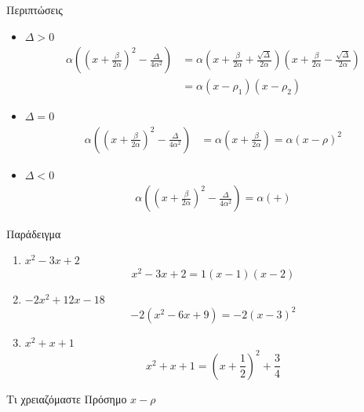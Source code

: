 \documentclass{../../presentation}
\begin{document}
\begin{frame}{Περιπτώσεις}
  \begin{itemize}[<+->]
    \item $Δ>0$
          \begin{align*}
            α\left(\left( x+\frac{β}{2α} \right)^2 - \frac{Δ}{4α^2}\right) & =
            α\left( x+\frac{β}{2α} + \frac{\sqrt{Δ}}{2α} \right)\left( x+\frac{β}{2α} - \frac{\sqrt{Δ}}{2α} \right) \\
                                                                           & = α(x-ρ_1)(x-ρ_2)
          \end{align*}
    \item $Δ=0$
          \begin{align*}
            α\left(\left( x+\frac{β}{2α} \right)^2 - \frac{Δ}{4α^2}\right) & =
            α\left( x+\frac{β}{2α} \right) = α(x-ρ)^2
          \end{align*}
    \item $Δ<0$
          \begin{align*}
            α\left(\left( x+\frac{β}{2α} \right)^2 - \frac{Δ}{4α^2}\right) =
            α\left(+\right)
          \end{align*}
  \end{itemize}
\end{frame}

\begin{frame}{Παράδειγμα}

  \begin{enumerate}[<+->]
    \item $x^2-3x+2$
          $$x^2-3x+2=1(x-1)(x-2)$$
    \item $-2x^2+12x-18$
          $$-2(x^2-6x+9)=-2(x-3)^2$$
    \item $x^2+x+1$
          $$x^2+x+1=\left(x+\frac{1}{2}\right)^2+\frac{3}{4}$$
  \end{enumerate}

\end{frame}

\begin{frame}{Τι χρειαζόμαστε}
  Πρόσημο $x-ρ$
  \begin{center}
  \end{center}

\end{frame}
\end{document}
